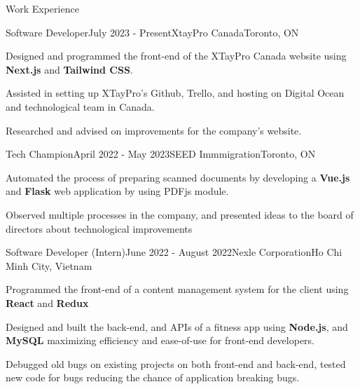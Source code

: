 \documentclass[
	11pt, %
]{resume} %
\begin{document}
\begin{rSection}{Work Experience}

	\begin{rSubsection}{Software Developer}{July 2023 - Present}{XtayPro Canada}{Toronto, ON}
		\item Designed and programmed the front-end of the XTayPro Canada website using \textbf{Next.js} and \textbf{Tailwind CSS}.
		\item Assisted in setting up XTayPro's Github, Trello, and hosting on Digital Ocean and technological team in Canada.
		\item Researched and advised on improvements for the company's website.
	\end{rSubsection}


	\begin{rSubsection}{Tech Champion}{April 2022 - May 2023}{SEED Immmigration}{Toronto, ON}
		\item Automated the process of preparing scanned documents by developing a \textbf{Vue.js} and \textbf{Flask} web application by using PDFjs module.
		\item Observed multiple processes in the company, and presented ideas to the board of directors about technological improvements
	\end{rSubsection}


	\begin{rSubsection}{Software Developer (Intern)}{June 2022 - August 2022}{Nexle Corporation}{Ho Chi Minh City, Vietnam}
		\item Programmed the front-end of a content management system for the client using \textbf{React} and \textbf{Redux}
		\item Designed and built the back-end, and APIs of a fitness app using \textbf{Node.js}, and \textbf{MySQL} maximizing efficiency and ease-of-use for front-end developers.
		\item Debugged old bugs on existing projects on both front-end and back-end, tested new code for bugs reducing the chance of application breaking bugs.
	\end{rSubsection}

\end{rSection}
\end{document}
